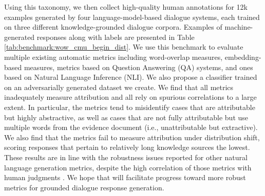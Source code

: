 Using this taxonomy, we then collect high-quality human annotations for 12k examples generated by four language-model-based dialogue systems, each trained on three different knowledge-grounded dialogue corpora. Examples of machine-generated responses along with labels are presented in Table \ref{tab:benchmark:wow_cmu_begin_dist}. 
We use this benchmark to evaluate multiple existing automatic metrics including word-overlap measures, embedding-based measures, metrics based on Question Answering (QA) systems, and ones based on Natural Language Inference (NLI). We also propose a classifier  trained on an adversarially generated dataset we create. We find that all metrics inadequately measure attribution and all rely on spurious correlations to a large extent. In particular, the metrics tend to misidentify cases that are attributable but highly abstractive, as well as cases that are not fully attributable but use multiple words from the evidence document (i.e., unattributable but extractive). We also find that the metrics fail to measure attribution under distribution shift, scoring responses that pertain to relatively long knowledge sources the lowest. These results are in line with the robustness issues reported for other natural language generation
metrics, despite the high  correlation of those metrics with human judgments \cite{durmus-etal-2022-spurious, gehrmann2021gem, gabriel-etal-2021-go, yeh-etal-2021-comprehensive}.
We hope that \BEGIN{} will facilitate progress toward more robust metrics for grounded dialogue response generation. 
















